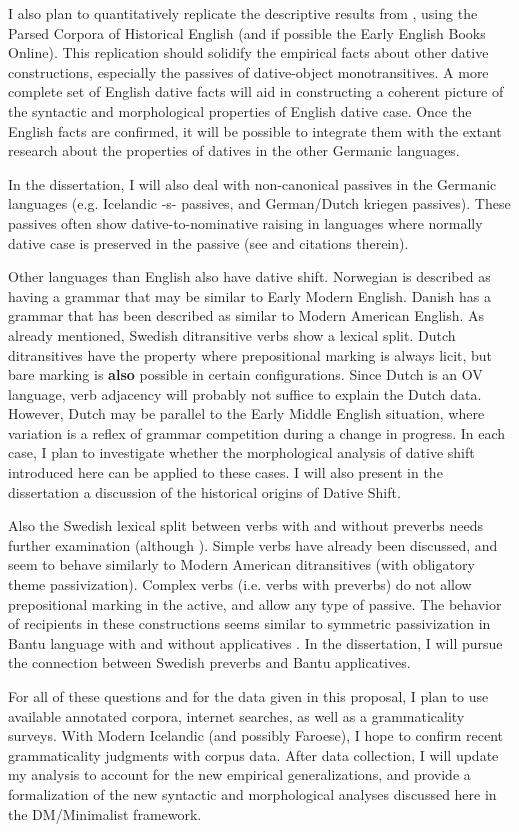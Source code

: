 I also plan to quantitatively replicate the descriptive results from \cite{Allan.1995}, using the Parsed Corpora of Historical English (and if possible the Early English Books Online). This replication should solidify the empirical facts about other dative constructions, especially the passives of dative-object monotransitives. A more complete set of English dative facts will aid in constructing a coherent picture of the syntactic and morphological properties of English dative case. Once the English facts are confirmed, it will be possible to integrate them with the extant research about the properties of datives in the other Germanic languages.

In the dissertation, I will also deal with non-canonical passives in the Germanic languages (e.g. Icelandic -s- passives, and German/Dutch kriegen passives). These passives often show dative-to-nominative raising in languages where normally dative case is preserved in the passive (see \cite{Alexiadou.2013,Alexiadou.2013b} and citations therein). 

Other languages than English also have dative shift. Norwegian is described as having a grammar that may be similar to Early Modern English. Danish has a grammar that has been described as similar to Modern American English. As already mentioned, Swedish ditransitive verbs show a lexical split. Dutch ditransitives have the property where prepositional marking is always licit, but bare marking is \textbf{also} possible in certain configurations. Since Dutch is an OV language, verb adjacency will probably not suffice to explain the Dutch data. However, Dutch may be parallel to the Early Middle English situation, where variation is a reflex of grammar competition during a change in progress. In each case, I plan to investigate whether the morphological analysis of dative shift introduced here can be applied to these cases. I will also present in the dissertation a discussion of the historical origins of Dative Shift.

Also the Swedish lexical split between verbs with and without preverbs needs further examination (although \citep{Lundquist.2004}). Simple verbs have already been discussed, and seem to behave similarly to Modern American ditransitives (with obligatory theme passivization). Complex verbs (i.e. verbs with preverbs) do not allow prepositional marking in the active, and allow any type of passive. The behavior of recipients in these constructions seems similar to symmetric passivization in Bantu language with and without applicatives \citep[and others]{Pylkkanen.2001,McGinnis.2001,McGinnis.2001b,Baker.2012}. In the dissertation, I will pursue the connection between Swedish preverbs and Bantu applicatives.

For all of these questions and for the data given in this proposal, I plan to use available annotated corpora, internet searches, as well as a grammaticality surveys. With Modern Icelandic (and possibly Faroese), I hope to confirm recent grammaticality judgments with corpus data. After data collection, I will update my analysis to account for the new empirical generalizations, and provide a formalization of the new syntactic and morphological analyses discussed here in the DM/Minimalist framework.
